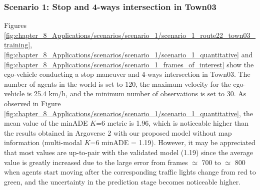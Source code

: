 
\subsubsection{Scenario 1: Stop and 4-ways intersection in Town03}
\label{subsubsec:8_experimental_results_scenario_1}

Figures \ref{fig:chapter_8_Applications/scenarios/scenario_1/scenario_1_route22_town03_training}, \ref{fig:chapter_8_Applications/scenarios/scenario_1/scenario_1_quantitative} and \ref{fig:chapter_8_Applications/scenarios/scenario_1_frames_of_interest} show the ego-vehicle conducting a stop maneuver and 4-ways intersection in Town03. The number of agents in the world is set to 120, the maximum velocity for the ego-vehicle is 25.4 km/h, and the minimum number of observations is set to 30. As observed in Figure \ref{fig:chapter_8_Applications/scenarios/scenario_1/scenario_1_quantitative}, the mean value of the \ac{minADE} $K$=6 metric is 1.96, which is noticeable higher than the results obtained in Argoverse 2 with our proposed model without map information (multi-modal $K$=6 \ac{minADE} = 1.19). However, it may be appreciated that most values are up-to-pair with the validated model (1.19) since the average value is greatly increased due to the large error from frames $\simeq$ 700 to $\simeq$ 800 when agents start moving after the corresponding traffic lights change from red to green, and the uncertainty in the prediction stage becomes noticeable higher.

